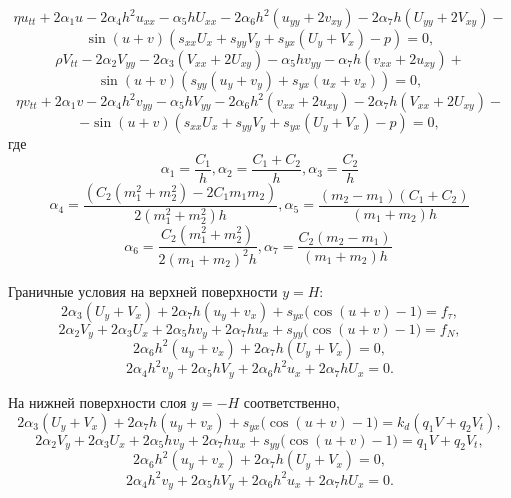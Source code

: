 \[
\eta u_{tt} + 2 \alpha_1 u - 2 \alpha_4 h^2 u_{xx} - \alpha_5 h  U_{xx} - 2 \alpha_6 h^2 (u_{yy} + 2 v_{xy}) - 2 \alpha_7 h (U_{yy} + 2 V_{xy}) - 
\]
\begin{equation}
	\sin{(u+v)}(s_{xx}U_x + s_{yy}V_y + s_{yx}(U_y + V_x)-p) = 0, \label{beq2}
\end{equation}
\[
\rho V_{tt} -2 \alpha_2 V_{yy} -2 \alpha_3 \left( V_{xx} + 2 U_{xy}\right) - \alpha_5 h v_{yy} - \alpha_7 h (v_{xx} + 2 u_{xy}) +
\]
\[
\sin{(u+v)}(s_{yy}(u_y + v_y)+ s_{yx}(u_x + v_x)) = 0,
\]
\[
\eta v_{tt} + 2 \alpha_1 v - 2 \alpha_4 h^2 v_{yy} - \alpha_5 h V_{yy} - 2 \alpha_6 h^2 (v_{xx} + 2 u_{xy}) - 2 \alpha_7 h (V_{xx} + 2 U_{xy}) - 
\]
\[
-\sin{(u+v)}(s_{xx}U_x + s_{yy}V_y + s_{yx}(U_y + V_x)-p) = 0,
\]
где
\[ \alpha_1 = \frac{C_1}{h},  \alpha_2 = \frac{C_1+C_2}{h} , 
\alpha_3 = \frac{C_2}{h}
\]
\[ 
\alpha_4 = \frac{\left(C_2\left(m_1^2 + m_2^2\right) - 2C_1 m_1 m_2\right)}{2\left(m_1^2 + m_2^2\right)h} , 
\alpha_5 = \frac{\left(m_2-m_1\right)\left(C_1+C_2\right)}{(m_1+m_2)h} 
\]
\[
\alpha_6 = \frac{C_2 \left(m_1^2+m_2^2\right)}{2\left(m_1+m_2\right)^2h} ,
\alpha_7 = \frac{C_2\left(m_2 - m_1\right)}{(m_1 + m_2)h} \
\] 


Граничные условия на верхней поверхности $y = H$:
\begin{equation}
	2 \alpha_3 (U_y + V_x) + 2 \alpha_7 h (u_y + v_x) + s_{yx}( \cos{(u + v)-1)} = f_{\tau}, \label{bc11}
\end{equation}
\begin{equation}
	2 \alpha_2 V_y + 2 \alpha_3 U_x + 2 \alpha_5 h v_y + 2 \alpha_7 h u_x + s_{yy} (\cos{(u + v)-1)}= f_N,\label{bc12}
\end{equation}
\begin{equation}
	2 \alpha_6 h^2 (u_y + v_x) + 2 \alpha_7 h (U_y + V_x) = 0,\label{bc13}
\end{equation}
\begin{equation}
	2 \alpha_4 h^2 v_y + 2 \alpha_5 h V_y + 2 \alpha_6 h^2 u_x + 2 \alpha_7 h U_x = 0. \label{bc14}
\end{equation}

На нижней поверхности слоя $y = -H $ соответственно,
\begin{equation}
	2 \alpha_3 (U_y + V_x) + 2 \alpha_7 h (u_y + v_x) + s_{yx} (\cos{(u + v)-1)} = k_d( q_1 V + q_2 V_t) ,\label{bc21}
\end{equation}
\begin{equation}
	2 \alpha_2 V_y + 2 \alpha_3 U_x + 2 \alpha_5 h v_y + 2 \alpha_7 h u_x + s_{yy} (\cos{(u + v)-1)}= q_1 V +q_2 V_t,\label{bc22}
\end{equation}
\begin{equation}
	2 \alpha_6 h^2 (u_y + v_x) + 2 \alpha_7 h (U_y + V_x) = 0, \label{bc23}
\end{equation}
\begin{equation}
	2 \alpha_4 h^2 v_y + 2 \alpha_5 h V_y + 2 \alpha_6 h^2 u_x + 2 \alpha_7 h U_x = 0 . \label{bc24}
\end{equation}

